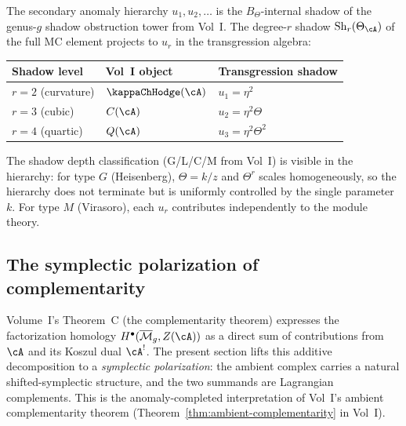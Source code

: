 \begin{remark}
The secondary anomaly hierarchy $u_1, u_2, \dots$ is the
$B_\Theta$-internal shadow of the genus-$g$ shadow obstruction
tower from Vol~I.
The degree-$r$ shadow $\mathrm{Sh}_r(\Theta_\cA)$ of the
full MC element projects to $u_r$ in the transgression algebra:
\begin{center}
\renewcommand{\arraystretch}{1.2}
\begin{tabular}{lll}
\textbf{Shadow level} & \textbf{Vol~I object} &
\textbf{Transgression shadow} \\
\hline
$r = 2$ (curvature) & $\kappaChHodge(\cA)$ & $u_1 = \eta^2$ \\
$r = 3$ (cubic) & $C(\cA)$ & $u_2 = \eta^2 \Theta$ \\
$r = 4$ (quartic) & $Q(\cA)$ & $u_3 = \eta^2 \Theta^2$
\end{tabular}
\end{center}
The shadow depth classification (G/L/C/M from Vol~I) is
visible in the hierarchy: for type $G$ (Heisenberg),
$\Theta = k/z$ and $\Theta^r$ scales homogeneously, so the
hierarchy does not terminate but is uniformly controlled by
the single parameter $k$.
For type $M$ (Virasoro), each $u_r$ contributes independently
to the module theory.
\end{remark}

\subsection{The symplectic polarization of complementarity}


Volume~I's Theorem~C (the complementarity theorem) expresses
the factorization homology $H^\bullet(\Mbar_g, Z(\cA))$
as a direct sum of contributions from $\cA$ and its Koszul
dual $\cA^!$.
The present section lifts this additive decomposition to a
\emph{symplectic polarization}: the ambient complex carries a
natural shifted-symplectic structure, and the two summands are
Lagrangian complements.
This is the anomaly-completed interpretation of
Vol~I's ambient complementarity theorem
(Theorem~\ref*{thm:ambient-complementarity} in Vol~I).

